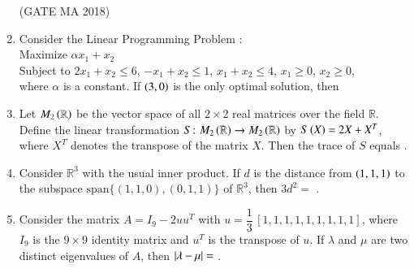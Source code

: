 \documentclass[journal,12pt,onecolumn]{IEEEtran}
\theoremstyle{remark}
\begin{document}
\begin{enumerate}[start=10]
\hfill(GATE MA 2018)
\begin{enumerate}
\end{enumerate}

\item Consider the Linear Programming Problem :\\
Maximize $\alpha x_1 + x_2$\\
Subject to $2x_1 + x_2 \le 6$, $-x_1 + x_2 \le 1$, $x_1 + x_2 \le 4$, $x_1 \ge 0$, $x_2 \ge 0$,\\
where $\alpha$ is a constant. If $\left(3, 0\right)$ is the only optimal solution, then

\hfill{}
\begin{enumerate}
\end{enumerate}

\item Let $M_2\left(\mathbb{R}\right)$ be the vector space of all $2 \times 2$ real matrices over the field $\mathbb{R}$. Define the linear
transformation $S \colon M_2\left(\mathbb{R}\right) \to M_2\left(\mathbb{R}\right)$ by $S\left(X\right) = 2X + X^{T}$, where $X^{T}$ denotes the transpose
of the matrix $X$. Then the trace of $S$ equals \underline{\hspace{2cm}}. 

\hfill{}

\item Consider $\mathbb{R}^3$ with the usual inner product. If $d$ is the distance from $\left(1, 1, 1\right)$ to the subspace
$\text{span}\{(1, 1, 0), (0, 1, 1)\}$ of $\mathbb{R}^3$, then $3d^{2} = $ \underline{\hspace{2cm}}.

\hfill{}

\item Consider the matrix $A = I_{9} - 2u u^{T}$ with $u = \dfrac{1}{3}\,[1, 1, 1, 1, 1, 1, 1, 1, 1]$, where $I_{9}$ is the $9 \times 9$
identity matrix and $u^{T}$ is the transpose of $u$. If $\lambda$ and $\mu$ are two distinct eigenvalues of $A$, then
$\left\vert\lambda - \mu\right\vert = $ \underline{\hspace{2cm}}. \hfill{}


\end{enumerate}
\end{document}
